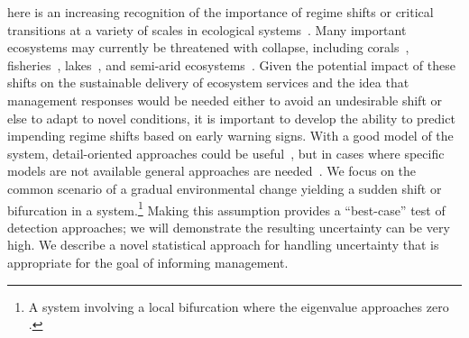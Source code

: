 \documentclass{pnastwo}
\begin{document}
\begin{article}

here is an increasing recognition of the importance of regime shifts or critical transitions at a variety of scales in ecological systems~\cite{Holling1973, Wissel1984, Scheffer2001, Scheffer2009, Drake2010, Carpenter2011}⁠. 
Many important ecosystems may currently be threatened with collapse, including corals~\cite{Bellwood2004}, fisheries~\cite{Berkes2006}⁠, lakes~\cite{Carpenter2011}, and semi-arid ecosystems~\cite{Kefi2007}⁠. 
Given the potential impact of  these shifts on the sustainable delivery of ecosystem services
and the idea that management responses would be needed either to avoid an undesirable shift or else to adapt to novel conditions,
it is important to develop the ability to predict impending regime shifts based on early warning signs. 
With a good model of the system, detail-oriented approaches could be useful~\cite{Lenton2009},
but in cases where specific models are not available general approaches are needed~\cite{Scheffer2009}⁠.
We focus on the common scenario of a gradual environmental change yielding a sudden shift or bifurcation in a system.\footnote{A system involving a local bifurcation where the eigenvalue approaches zero \cite{Scheffer2001, Scheffer2009}.}  
Making this assumption provides a ``best-case'' test of detection approaches;
we will demonstrate the resulting uncertainty can be very high.
We describe a novel statistical approach for handling uncertainty that is appropriate for the goal of informing management.  


\end{article}
\end{document}
